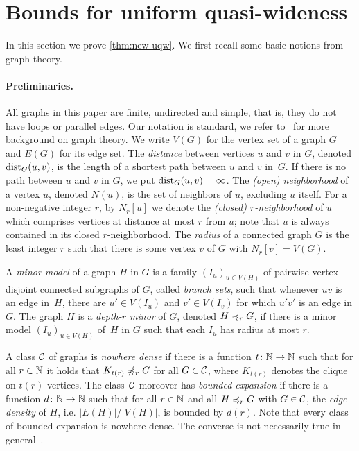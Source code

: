 \section{Bounds for uniform quasi-wideness}\label{sec:uqw}

In this section we prove \cref{thm:new-uqw}. 
We first recall some basic notions from graph theory. 

\paragraph*{Preliminaries.}
All graphs in this paper are finite, undirected and simple, that is, 
they do not have loops or parallel edges. Our notation is standard,
we refer to~\cite{diestel2012graph} for more background on 
graph theory. 
We write $V(G)$ for the vertex set of a graph $G$ and
$E(G)$ for its edge set. 
The {\em{distance}} between vertices $u$ and $v$ in $G$, denoted $\mathrm{dist}_G(u,v)$, is the length of a shortest path between $u$ and $v$ in~$G$.
If there is no path between $u$ and $v$ in $G$, we put $\mathrm{dist}_G(u,v)=\infty$.
The {\em{(open) neighborhood}} of a vertex $u$, denoted $N(u)$, is the set of neighbors of $u$, excluding $u$ itself.
For a non-negative integer $r$, by $N_r[u]$ we denote the {\em{(closed) $r$-neighborhood}} of $u$ which comprises vertices at distance at most $r$ from $u$; 
note that $u$ is always contained in its closed $r$-neighborhood. The \emph{radius} of a connected graph $G$ is the least integer $r$ such that there is some vertex $v$ of $G$ with $N_r[v]=V(G)$.


A {\em{minor model}} of a graph $H$ in $G$ is a family $(I_u)_{u\in V(H)}$ of pairwise vertex-disjoint connected subgraphs of $G$, called {\em{branch sets}},
such that whenever $uv$ is an edge in~$H$, there are $u'\in V(I_u)$ and $v'\in V(I_v)$ for which $u'v'$ 
is an edge in $G$.
The graph $H$ is a {\em{depth-$r$ minor}} of $G$, denoted $H\preccurlyeq_rG$, if there is a minor model
$(I_u)_{u\in V(H)}$ of~$H$ in $G$ such that each $I_u$ has radius at most $r$.

A class $\mathcal{C}$ of graphs is \emph{nowhere dense} if there is a function 
$t\colon \mathbb{N}\rightarrow \mathbb{N}$ such that for all $r\in \mathbb{N}$ it holds that $K_{t(r)}\not\preccurlyeq_r G$
for all $G\in \mathcal{C}$, where $K_{t(r)}$ denotes the clique on $t(r)$ vertices.
The class~$\mathcal{C}$ moreover has \emph{bounded expansion}
if there is a function $d\colon\mathbb{N}\rightarrow\mathbb{N}$ such that for all 
$r\in \mathbb{N}$ and all $H\preccurlyeq_rG$ with $G\in\mathcal{C}$, the {\em{edge density}}
of $H$, i.e. $|E(H)|/|V(H)|$, is bounded by $d(r)$. Note that every 
class of bounded expansion is nowhere dense. The converse is not necessarily true in general~\cite{sparsity}.

